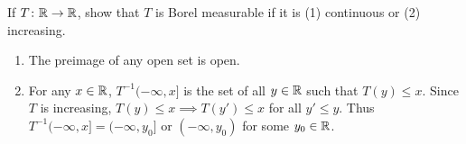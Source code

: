 \documentclass[12pt]{article}
\begin{document}
\begin{problem*}
    If $T\colon \mathbb{R} \to \mathbb{R}$, show that $T$ is Borel measurable if it is
    (1) continuous or (2) increasing.
\end{problem*}
\begin{solution} \leavevmode
    \begin{enumerate}
        \item The preimage of any open set is open.
        \item For any $x \in \mathbb{R}$, $T^{-1}(-\infty, x]$ is the set of all
        $y \in \mathbb{R}$ such that $T(y) \le x$.
        Since $T$ is increasing, $T(y) \le x \implies T(y') \le x$ for all
        $y' \le y$.
        Thus $T^{-1}(-\infty, x] = (-\infty, y_0]$ or $(-\infty, y_0)$
        for some $y_0 \in \mathbb{R}$. \qedhere
    \end{enumerate}
\end{solution}
\end{document}
